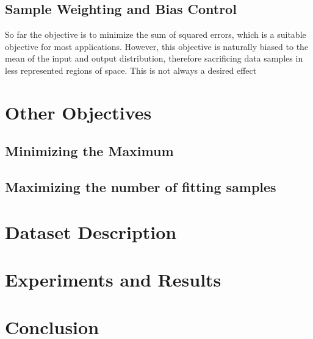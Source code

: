 \documentclass[useAMS,usenatbib,fleqn]{mn2e}
\begin{document}
\subsection{Sample Weighting and Bias Control}

So far the objective is to minimize the sum of squared errors, which is a suitable objective for most applications. However, this objective is naturally biased to the mean of the input and output distribution, therefore sacrificing data samples in less represented regions of space. This is not always a desired effect

\section{Other Objectives}
\label{sec-other-objectives}

\subsection{Minimizing the Maximum}
\subsection{Maximizing the number of fitting samples}

\section{Dataset Description}
\label{sec-dataset}

\section{Experiments and Results}
\label{sec-experiment}

\section{Conclusion}
\label{sec-conclusion}

\footnotesize{

	
}
\end{document}
